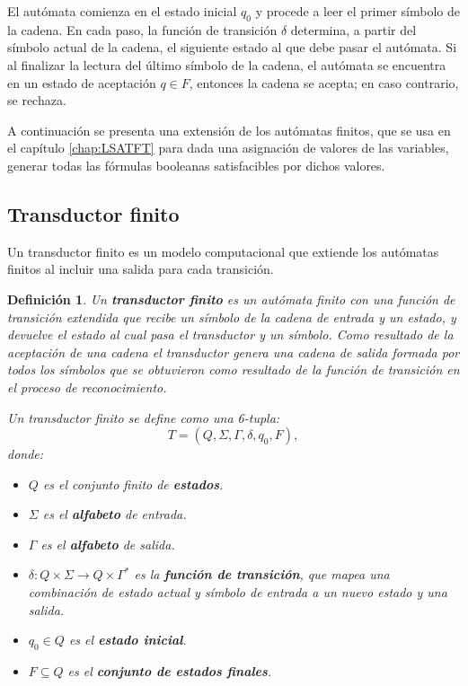 \documentclass[12pt]{article}
\newtheorem{definition}{Definición}
\begin{document}
El autómata comienza en el estado inicial $q_0$ y procede a leer el primer símbolo de la cadena.  En cada paso, la función de transición $\delta$ determina, a partir del símbolo actual de la cadena, el siguiente estado al que debe pasar el autómata.  Si al finalizar la lectura del último símbolo de la cadena, el autómata se encuentra en un estado de aceptación $q \in F$, entonces la cadena se acepta; en caso contrario, se rechaza.

A continuación se presenta una extensión de los autómatas finitos, que se usa en el capítulo \ref{chap:LSATFT} para dada una asignación de valores de las variables, generar todas las fórmulas booleanas satisfacibles por dichos valores.

\subsection{Transductor finito}

Un transductor finito \cite{finite_transducer} es un modelo computacional que extiende los autómatas finitos al incluir una salida para cada transición.

\begin{definition}
  Un \textbf{transductor finito} es un autómata finito con una función de transición extendida que recibe un símbolo de la cadena de entrada y un estado, y devuelve el estado al cual pasa el transductor y un símbolo.  Como resultado de la aceptación de una cadena el transductor genera una cadena de salida formada por todos los símbolos que se obtuvieron como resultado de la función de transición en el proceso de reconocimiento.
  
  Un transductor finito se define como una 6-tupla:
  \[
    T = (Q, \Sigma, \Gamma, \delta, q_0, F),
  \]
  donde:
  \begin{itemize}
    \item \(Q\) es el conjunto finito de \textbf{estados}.
    \item \(\Sigma\) es el \textbf{alfabeto} de entrada.
    \item \(\Gamma\) es el \textbf{alfabeto} de salida.
    \item \(\delta: Q \times \Sigma \to Q \times \Gamma^*\) es la \textbf{función de transición}, que mapea una combinación de estado actual y símbolo de entrada a un nuevo estado y una salida.
    \item \(q_0 \in Q\) es el \textbf{estado inicial}.
    \item \(F \subseteq Q\) es el \textbf{conjunto de estados finales}.
  \end{itemize}
\end{definition}
\end{document}
